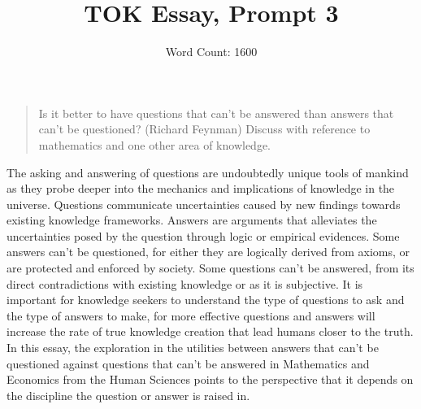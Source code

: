 \documentclass[a4paper,12pt]{article}
\title{\vspace{-8ex}TOK Essay, Prompt 3}
\author{Word Count: 1600}
\date{}
\begin{document}
\maketitle
\begin{quote}
    Is it better to have questions that can't be answered than answers that can't be questioned? (Richard Feynman) Discuss with reference to mathematics and one other area of knowledge.
\end{quote}

The asking and answering of questions are undoubtedly unique tools of mankind as they probe deeper into the mechanics and implications of knowledge in the universe. Questions communicate uncertainties caused by new findings towards existing knowledge frameworks. Answers are arguments that alleviates the uncertainties posed by the question through logic or empirical evidences. Some answers can’t be questioned, for either they are logically derived from axioms, or are protected and enforced by society. Some questions can’t be answered, from its direct contradictions with existing knowledge or as it is subjective. It is important for knowledge seekers to understand the type of questions to ask and the type of answers to make, for more effective questions and answers will increase the rate of true knowledge creation that lead humans closer to the truth. In this essay, the exploration in the utilities between answers that can't be questioned against questions that can't be answered in Mathematics and Economics from the Human Sciences points to the perspective that it depends on the discipline the question or answer is raised in.


\end{document}
